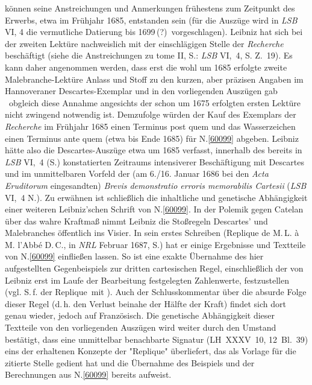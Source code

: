 \begin{ledgroup}
können seine \cite{02082}Anstreichungen und Anmerkungen frühestens zum Zeitpunkt des Erwerbs, etwa im Frühjahr 1685, entstanden sein 
(für die \cite{02082}Auszüge wird in \textit{LSB} VI, 4 die vermutliche Datierung  bis 1699\,(?)\grqq\ vorgeschlagen).
\pend
\pstart
Leibniz hat sich bei der zweiten Lektüre nachweislich mit der einschlägigen Stelle der \textit{Recherche} beschäftigt
(siehe die Anstreichungen zu tome II, S.: \cite{02082}\textit{LSB} VI,~4, S. Z.~19).
Es kann daher angenommen werden, dass erst die wohl um 1685 erfolgte zweite Malebranche-Lektüre Anlass und Stoff zu den kurzen, aber präzisen Angaben im Hannoveraner Descartes-Exemplar und in den vorliegenden Auszügen gab
\textendash\ obgleich diese Annahme angesichts der schon um 1675 erfolgten ersten Lektüre nicht zwingend notwendig ist.
Demzufolge würden 
der Kauf des Exemplars der \textit{Recherche} im Frühjahr 1685 einen Terminus post quem
und das Wasserzeichen einen Terminus ante quem (etwa bis Ende 1685)
für N.\;\ref{60099} abgeben.
Leibniz hätte also die Descartes-Auszüge etwa um 1685 verfasst,
innerhalb des bereits in \textit{LSB} VI,~4 (S.) konstatierten Zeitraums intensiverer Beschäftigung mit Descartes und im unmittelbaren Vorfeld der 
(am 6./16. Januar 1686 bei den \textit{Acta Eruditorum} eingesandten) 
\cite{01099}\textit{Brevis demonstratio erroris memorabilis Cartesii} (\textit{LSB} VI,~4 N.).
\pend
\pstart
Zu erwähnen ist schließlich die inhaltliche und genetische Abhängigkeit einer weiteren Leibniz'schen Schrift  von N.\;\ref{60099}.
In der Polemik gegen 
Catelan 
über das wahre Kraftmaß 
nimmt Leibniz die Stoßregeln 
Descartes' und Malebranches 
öffentlich ins Visier.
In sein erstes Schreiben
(\cite{02086}\glqq Replique de M.\,L. à M. l'Abbé D.\,C.\grqq, in \textit{NRL} Februar 1687, S.)
hat er einige Ergebnisse und Textteile von N.\;\ref{60099} einfließen lassen.
So ist eine exakte Übernahme des hier aufgestellten Gegenbeispiels zur dritten cartesischen Regel, einschließlich der von Leibniz erst im Laufe der Bearbeitung festgelegten Zahlenwerte, festzustellen (vgl. S.\,f. der \glqq Replique\grqq\ mit ).
Auch der Schlusskommentar über die absurde Folge dieser Regel (d.\,h. den Verlust beinahe der Hälfte der Kraft) findet sich dort genau wieder, jedoch auf Französisch.
Die genetische Abhängigkeit dieser Textteile von den vorliegenden Auszügen 
wird weiter durch den Umstand bestätigt, dass 
eine unmittelbar benachbarte Signatur (LH~XXXV~10, 12~Bl.~39)
eins der erhaltenen Konzepte der "Replique" überliefert,
das als Vorlage für die zitierte Stelle gedient hat und die Übernahme des Beispiels und der Berechnungen aus N.\;\ref{60099} bereits aufweist.
\pend
\end{ledgroup}
